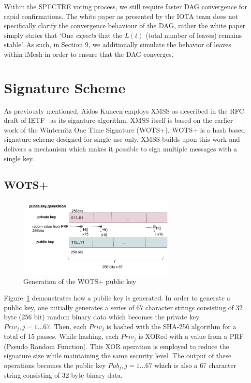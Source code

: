 \documentclass[a4paper,10pt,twocolumn]{article}
\begin{document}
	Within the SPECTRE voting process, we still require faster DAG convergence for rapid confirmations. The white paper as presented by the 
	IOTA team does not specifically clarify the convergence behaviour of the DAG, rather the white paper simply states that `One 
	\emph{expects} that the \( L(t) \) (total number of leaves) remains stable'. As such, in Section 9, we additionally simulate the behavior of leaves within iMesh in order to ensure that the DAG converges.
	
	\section{Signature Scheme}
	\label{sec:sig}
	
	As previously mentioned, Aidos Kuneen employs XMSS as described in the RFC draft of IETF~\cite{ietf} as its signature algorithm. XMSS 
	itself is based on the earlier work of the Winternitz One Time Signature (WOTS+). WOTS+ is a hash based signature scheme designed for 
	single use only, XMSS builds upon this work and delivers a mechanism which makes it possible to sign multiple messages with a single 
	key.
	
	\subsection{WOTS+}
	
	\begin{figure}[ht]
		\begin{center}
		\includegraphics[width=80mm]{wots_pub.png}
		  \caption{Generation of the WOTS+ public key}
		\label{fig:wots_pub}
		\end{center}
	 \end{figure}
	
	\vspace{-3.5mm}
	
	 Figure~\ref{fig:wots_pub} demonstrates how a public key is generated. In order to generate a public key, one initially generates a series of 67 character strings consisting of 32 byte (256 bit) random binary data which becomes the 
	 private key \( Priv_{j}, j=1 \ldots 67\). Then, each \( Priv_{j} \) is hashed with the SHA-256 algorithm for a total of 15 passes. 
	 While hashing, each \( Priv_{j} \) is XORed with a value from a PRF (Pseudo Random Function). This XOR operation is employed to reduce 
	 the signature size while maintaining the same security level. The output of these operations becomes the public 
	 key \( Pub_{j}, j=1 \ldots 67\) which is also a 67 character string consisting of 32 byte binary data.
	
\end{document}
